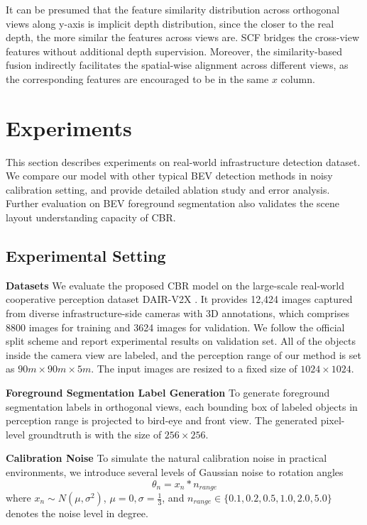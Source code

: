 \documentclass[letterpaper, 10 pt, conference]{ieeeconf}
\begin{document}
It can be presumed that the feature similarity distribution across orthogonal views along y-axis is implicit depth distribution, since the closer to the real depth, the more similar the features across views are. SCF bridges the cross-view features without additional depth supervision. Moreover, the similarity-based fusion indirectly facilitates the spatial-wise alignment across different views, as the corresponding features are encouraged to be in the same $x$ column.

\section{Experiments}
This section describes experiments on real-world infrastructure detection dataset. We compare our model with other typical BEV detection methods in noisy calibration setting, and provide detailed ablation study and error analysis. Further evaluation on BEV foreground segmentation also validates the scene layout understanding capacity of CBR.

\subsection{Experimental Setting}
\textbf{Datasets}
We evaluate the proposed CBR model on the large-scale real-world cooperative perception dataset DAIR-V2X \cite{yu2022dair}. It provides 12,424 images captured from diverse infrastructure-side cameras with 3D annotations, which comprises 8800 images for training and 3624 images for validation. We follow the official split scheme and report experimental results on validation set. All of the objects inside the camera view are labeled, and the perception range of our method is set as $90m \times 90m \times 5m$. The input images are resized to a fixed size of $1024 \times 1024$.

\textbf{Foreground Segmentation Label Generation}
To generate foreground segmentation labels in orthogonal views, each bounding box of labeled objects in perception range is projected to bird-eye and front view. The generated pixel-level groundtruth is with the size of $256 \times 256$.

\textbf{Calibration Noise}
To simulate the natural calibration noise in practical environments, we introduce several levels of Gaussian noise to rotation angles
\begin{equation}
  \theta_n = x_n * n_{range}
\end{equation}
where $x_n \sim N(\mu, \sigma^2)$, $\mu = 0, \sigma = \frac{1}{3}$, and $n_{range} \in \{0.1, 0.2, 0.5, 1.0, 2.0, 5.0\}$ denotes the noise level in degree.
\end{document}
